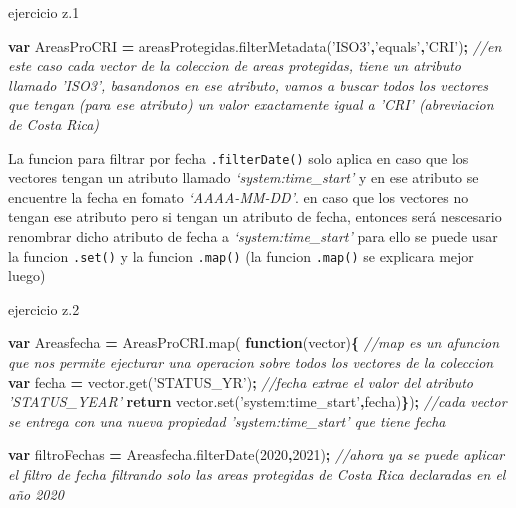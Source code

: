 \documentclass[
]{article}
\newenvironment{Shaded}{\begin{snugshade}}{\end{snugshade}}
\newcommand{\AttributeTok}[1]{\textcolor[rgb]{0.77,0.63,0.00}{#1}}
\newcommand{\CommentTok}[1]{\textcolor[rgb]{0.56,0.35,0.01}{\textit{#1}}}
\newcommand{\ControlFlowTok}[1]{\textcolor[rgb]{0.13,0.29,0.53}{\textbf{#1}}}
\newcommand{\DecValTok}[1]{\textcolor[rgb]{0.00,0.00,0.81}{#1}}
\newcommand{\KeywordTok}[1]{\textcolor[rgb]{0.13,0.29,0.53}{\textbf{#1}}}
\newcommand{\NormalTok}[1]{#1}
\newcommand{\OperatorTok}[1]{\textcolor[rgb]{0.81,0.36,0.00}{\textbf{#1}}}
\newcommand{\StringTok}[1]{\textcolor[rgb]{0.31,0.60,0.02}{#1}}
\newcommand{\VariableTok}[1]{\textcolor[rgb]{0.00,0.00,0.00}{#1}}
\begin{document}
ejercicio z.1

\begin{Shaded}
\begin{Highlighting}[]
\KeywordTok{var}\NormalTok{ AreasProCRI }\OperatorTok{=} \VariableTok{areasProtegidas}\NormalTok{.}\AttributeTok{filterMetadata}\NormalTok{(}\StringTok{'ISO3'}\OperatorTok{,}\StringTok{'equals'}\OperatorTok{,}\StringTok{'CRI'}\NormalTok{)}\OperatorTok{;} \CommentTok{//en este caso cada vector de la coleccion de areas protegidas, tiene un atributo llamado 'ISO3', basandonos en ese atributo, vamos a buscar todos los vectores que tengan (para ese atributo) un valor exactamente igual a 'CRI' (abreviacion de Costa Rica) }
\end{Highlighting}
\end{Shaded}

\begin{tipblock}

La funcion para filtrar por fecha \texttt{.filterDate()} solo aplica en
caso que los vectores tengan un atributo llamado
\emph{`system:time\_start'} y en ese atributo se encuentre la fecha en
fomato \emph{`AAAA-MM-DD'}. en caso que los vectores no tengan ese
atributo pero si tengan un atributo de fecha, entonces será nescesario
renombrar dicho atributo de fecha a \emph{`system:time\_start'} para
ello se puede usar la funcion \texttt{.set()} y la funcion
\texttt{.map()} (la funcion \texttt{.map()} se explicara mejor luego)

ejercicio z.2

\begin{Shaded}
\begin{Highlighting}[]
\KeywordTok{var}\NormalTok{ Areasfecha }\OperatorTok{=} \VariableTok{AreasProCRI}\NormalTok{.}\AttributeTok{map}\NormalTok{( }\KeywordTok{function}\NormalTok{(vector)}\OperatorTok{\{} \CommentTok{//map es un afuncion que nos permite ejecturar una operacion sobre todos los vectores de la coleccion}
  \KeywordTok{var}\NormalTok{ fecha }\OperatorTok{=} \VariableTok{vector}\NormalTok{.}\AttributeTok{get}\NormalTok{(}\StringTok{'STATUS_YR'}\NormalTok{)}\OperatorTok{;} \CommentTok{//fecha extrae el valor del atributo 'STATUS_YEAR'}
  \ControlFlowTok{return} \VariableTok{vector}\NormalTok{.}\AttributeTok{set}\NormalTok{(}\StringTok{'system:time_start'}\OperatorTok{,}\NormalTok{fecha)}\OperatorTok{\}}\NormalTok{)}\OperatorTok{;} \CommentTok{//cada vector se entrega con una nueva propiedad 'system:time_start' que tiene fecha}

\KeywordTok{var}\NormalTok{ filtroFechas }\OperatorTok{=} \VariableTok{Areasfecha}\NormalTok{.}\AttributeTok{filterDate}\NormalTok{(}\DecValTok{2020}\OperatorTok{,}\DecValTok{2021}\NormalTok{)}\OperatorTok{;} \CommentTok{//ahora ya se puede aplicar el filtro de fecha filtrando solo las areas protegidas de Costa Rica declaradas en el año 2020 }
\end{Highlighting}
\end{Shaded}


\end{tipblock}
\end{document}
